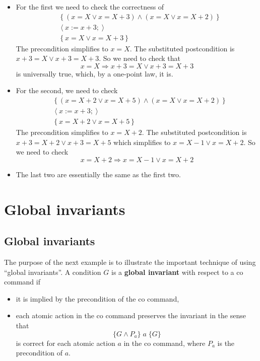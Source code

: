 \documentclass[muchmore,11pt]{article}%
\begin{document}
\begin{itemize}
\begin{itemize}
\item For the first we need to check the correctness of%
\begin{align*}
&  \left\{  \left(  x=X\vee x=X+3\right)  \wedge\left(  x=X\vee x=X+2\right)
\right\} \\
&  \left\langle x:=x+3;\right\rangle \\
&  \left\{  x=X\vee x=X+3\right\}
\end{align*}
The precondition simplifies to $x=X$. The substituted postcondition is
$x+3=X\vee x+3=X+3$. So we need to check that%
\[
x=X\Rightarrow x+3=X\vee x+3=X+3
\]
is universally true, which, by a one-point law, it is.

\item For the second, we need to check%
\begin{align*}
&  \left\{  \left(  x=X+2\vee x=X+5\right)  \wedge\left(  x=X\vee
x=X+2\right)  \right\} \\
&  \left\langle x:=x+3;\right\rangle \\
&  \left\{  x=X+2\vee x=X+5\right\}
\end{align*}
The precondition simplifies to $x=X+2$. The substituted postcondition is
$x+3=X+2\vee x+3=X+5$ which simplifies to $x=X-1\vee x=X+2$. So we need to
check%
\[
x=X+2\Rightarrow x=X-1\vee x=X+2
\]


\item The last two are essentially the same as the first two.
\end{itemize}
\end{itemize}

\section{Global invariants\label{global}}

\subsection{Global invariants}

The purpose of the next example is to illustrate the important technique of
using \textquotedblleft global invariants\textquotedblright. A condition $G$
is a \textbf{global invariant} with respect to a co command if

\begin{itemize}
\item it is implied by the precondition of the co command,

\item each atomic action in the co command preserves the invariant in the
sense that%
\[
\{G\wedge P_{a}\}\;a\;\{G\}
\]
is correct for each atomic action $a$ in the co command, where $P_{a}$ is the
precondition of $a$.
\end{itemize}
\end{document}
